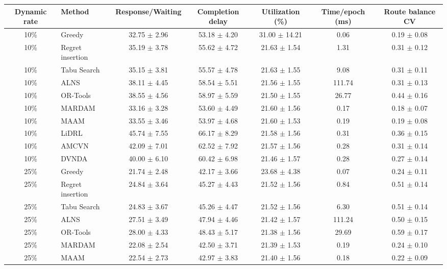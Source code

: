 \begin{tabular}{clccccc}
\toprule
Dynamic rate & Method & Response/Waiting & Completion delay & Utilization (\%) & Time/epoch (ms) & Route balance CV \\
\midrule
10\% & Greedy & 32.75 $\pm$ 2.96 & 53.18 $\pm$ 4.20 & 31.00 $\pm$ 14.21 & 0.06 & 0.19 $\pm$ 0.08 \\
10\% & Regret insertion & 35.19 $\pm$ 3.78 & 55.62 $\pm$ 4.72 & 21.63 $\pm$ 1.54 & 1.31 & 0.31 $\pm$ 0.12 \\
10\% & Tabu Search & 35.15 $\pm$ 3.81 & 55.57 $\pm$ 4.78 & 21.63 $\pm$ 1.55 & 9.08 & 0.31 $\pm$ 0.11 \\
10\% & ALNS & 38.11 $\pm$ 4.45 & 58.54 $\pm$ 5.51 & 21.56 $\pm$ 1.55 & 111.74 & 0.31 $\pm$ 0.13 \\
10\% & OR-Tools & 38.55 $\pm$ 4.56 & 58.97 $\pm$ 5.59 & 21.50 $\pm$ 1.55 & 26.77 & 0.44 $\pm$ 0.16 \\
10\% & MARDAM & 33.16 $\pm$ 3.28 & 53.60 $\pm$ 4.49 & 21.60 $\pm$ 1.56 & 0.17 & 0.18 $\pm$ 0.07 \\
10\% & MAAM & 33.55 $\pm$ 3.46 & 53.97 $\pm$ 4.68 & 21.60 $\pm$ 1.53 & 0.19 & 0.19 $\pm$ 0.08 \\
10\% & LiDRL & 45.74 $\pm$ 7.55 & 66.17 $\pm$ 8.29 & 21.58 $\pm$ 1.56 & 0.31 & 0.36 $\pm$ 0.15 \\
10\% & AMCVN & 42.09 $\pm$ 7.01 & 62.52 $\pm$ 7.92 & 21.57 $\pm$ 1.56 & 0.28 & 0.31 $\pm$ 0.14 \\
10\% & DVNDA & 40.00 $\pm$ 6.10 & 60.42 $\pm$ 6.98 & 21.46 $\pm$ 1.57 & 0.28 & 0.27 $\pm$ 0.14 \\
25\% & Greedy & 21.74 $\pm$ 2.48 & 42.17 $\pm$ 3.66 & 23.68 $\pm$ 4.38 & 0.07 & 0.24 $\pm$ 0.11 \\
25\% & Regret insertion & 24.84 $\pm$ 3.64 & 45.27 $\pm$ 4.43 & 21.52 $\pm$ 1.56 & 0.84 & 0.51 $\pm$ 0.14 \\
25\% & Tabu Search & 24.83 $\pm$ 3.67 & 45.26 $\pm$ 4.47 & 21.52 $\pm$ 1.56 & 6.30 & 0.51 $\pm$ 0.14 \\
25\% & ALNS & 27.51 $\pm$ 3.49 & 47.94 $\pm$ 4.46 & 21.42 $\pm$ 1.57 & 111.24 & 0.50 $\pm$ 0.15 \\
25\% & OR-Tools & 28.00 $\pm$ 4.33 & 48.43 $\pm$ 5.17 & 21.38 $\pm$ 1.56 & 29.69 & 0.59 $\pm$ 0.17 \\
25\% & MARDAM & 22.08 $\pm$ 2.54 & 42.50 $\pm$ 3.71 & 21.39 $\pm$ 1.53 & 0.19 & 0.24 $\pm$ 0.10 \\
25\% & MAAM & 22.54 $\pm$ 2.73 & 42.97 $\pm$ 3.83 & 21.40 $\pm$ 1.56 & 0.18 & 0.22 $\pm$ 0.09 \\

\end{tabular}
